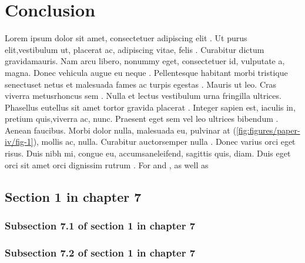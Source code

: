 \chapter[Conclusion]{Conclusion}

\regularsection
\headerregularsection

\begin{sloppypar} %

Lorem  ipsum dolor sit amet, consectetuer adipiscing elit \cite{LIUDIMULYO201767}. Ut purus  elit,vestibulum ut, placerat ac, adipiscing vitae, felis . Curabitur dictum  gravidamauris. Nam arcu libero, nonummy eget, consectetuer id, vulputate a, magna. Donec vehicula augue eu neque \cite{liudimulyo_2018}. Pellentesque habitant morbi tristique senectuset netus et malesuada fames ac turpis egestas . Mauris ut leo. Cras viverra metusrhoncus sem \cite{2019liudimulyo}. Nulla et lectus vestibulum urna fringilla ultrices. Phasellus eutellus sit amet tortor gravida placerat . Integer sapien est, iaculis in, pretium quis,viverra ac, nunc. Praesent eget sem vel leo ultrices bibendum \cite{liudimulyo2020853}. Aenean faucibus. Morbi dolor nulla, malesuada eu, pulvinar at (\ref{fig:figures/paper-iv/fig-1}), mollis ac, nulla. Curabitur auctorsemper nulla . Donec varius orci eget risus. Duis nibh mi, congue eu, accumsaneleifend, sagittis quis, diam. Duis eget orci sit amet orci dignissim rutrum \cite{LIUDIMULYO201767,liudimulyo_2018,2019liudimulyo,liudimulyo2020853,liudimulyo_unpublished1,liudimulyo_unpublished2}. For  and , as well as 

\end{sloppypar}

\section{Section 1 in chapter 7}
\lipsum[2-4]

\subsection{Subsection 7.1 of section 1 in chapter 7}
\lipsum[5-7]

\subsection{Subsection 7.2 of section 1 in chapter 7}
\lipsum[8-11]

